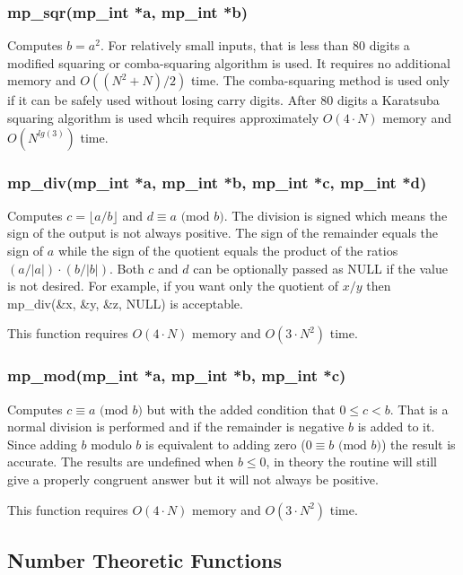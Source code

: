 \documentclass{article}
\begin{document}
\subsubsection{mp\_sqr(mp\_int *a, mp\_int *b)}
Computes $b = a^2$. 
For relatively small inputs, that is less than 80 digits a modified squaring or comba-squaring algorithm is used.  It
requires no additional memory and $O((N^2 + N)/2)$ time.  The comba-squaring method is used only if it can be safely used
without losing carry digits.  After 80 digits a Karatsuba squaring algorithm is used whcih requires approximately 
$O(4 \cdot N)$ memory and $O(N^{lg(3)})$ time.

\subsubsection{mp\_div(mp\_int *a, mp\_int *b, mp\_int *c, mp\_int *d)}
Computes $c = \lfloor a/b \rfloor$ and $d \equiv a \mbox{ (mod }b\mbox{)}$.  The division is signed which means the sign
of the output is not always positive.  The sign of the remainder equals the sign of $a$ while the sign of the 
quotient equals the product of the ratios $(a/\vert a \vert) \cdot (b/\vert b \vert)$.  Both $c$ and $d$ can be 
optionally passed as NULL if the value is not desired.  For example, if you want only the quotient of $x/y$ then 
mp\_div(\&x, \&y, \&z, NULL) is acceptable.

This function requires $O(4 \cdot N)$ memory and $O(3 \cdot N^2)$ time.

\subsubsection{mp\_mod(mp\_int *a, mp\_int *b, mp\_int *c)}
Computes $c \equiv a \mbox{ (mod }b\mbox{)}$ but with the added condition that $0 \le c < b$.  That is a normal 
division is performed and if the remainder is negative $b$ is added to it.  Since adding $b$ modulo $b$ is equivalent
to adding zero ($0 \equiv b \mbox{ (mod }b\mbox{)}$) the result is accurate.  The results are undefined 
when $b \le 0$, in theory the routine will still give a properly congruent answer but it will not always be positive. 

This function requires $O(4 \cdot N)$ memory and $O(3 \cdot N^2)$ time.

\subsection{Number Theoretic Functions}
\end{document}
